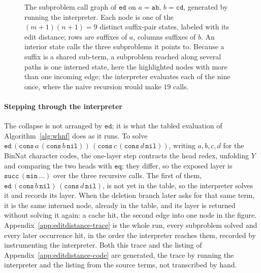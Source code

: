 \begin{figure}
  \centering
  
  \caption{The subproblem call graph of $\mathtt{ed}$ on $a=\mathtt{ab}$, $b=\mathtt{cd}$, generated by running
    the interpreter. Each node is one of the $(m{+}1)(n{+}1)=9$ distinct suffix-pair states, labeled with
    its edit distance; rows are suffixes of $a$, columns suffixes of $b$. An interior state calls the three
    subproblems it points to. Because a suffix is a shared sub-term, a subproblem reached along several
    paths is one interned state, here the highlighted nodes with more than one incoming edge; the interpreter
  evaluates each of the nine once, where the naive recursion would make $19$ calls.}
  \label{fig:editdistance}
\end{figure}

\paragraph{Stepping through the interpreter}
The collapse is not arranged by $\mathtt{ed}$; it is what the tabled evaluation of Algorithm~\ref{alg:whnf} does as it runs. To solve $\mathtt{ed}\,(\mathtt{cons}\,a\,(\mathtt{cons}\,b\,\mathtt{nil}))\,(\mathtt{cons}\,c\,(\mathtt{cons}\,d\,\mathtt{nil}))$, writing $a,b,c,d$ for the BinNat character codes, the one-layer step contracts the head redex, unfolding $Y$ and comparing the two heads with $\mathtt{eq}$; they differ, so the exposed layer is $\mathtt{succ}\,(\mathtt{min}\,\dots)$ over the three recursive calls. The first of them, $\mathtt{ed}\,(\mathtt{cons}\,b\,\mathtt{nil})\,(\mathtt{cons}\,d\,\mathtt{nil})$, is not yet in the table, so the interpreter solves it and records its layer. When the deletion branch later asks for that same term, it is the same interned node, already in the table, and its layer is returned without solving it again: a cache hit, the second edge into one node in the figure. Appendix~\ref{app:editdistance-trace} is the whole run, every subproblem solved and every later occurrence hit, in the order the interpreter reaches them, recorded by instrumenting the interpreter. Both this trace and the listing of Appendix~\ref{app:editdistance-code} are generated, the trace by running the interpreter and the listing from the source terms, not transcribed by hand.

